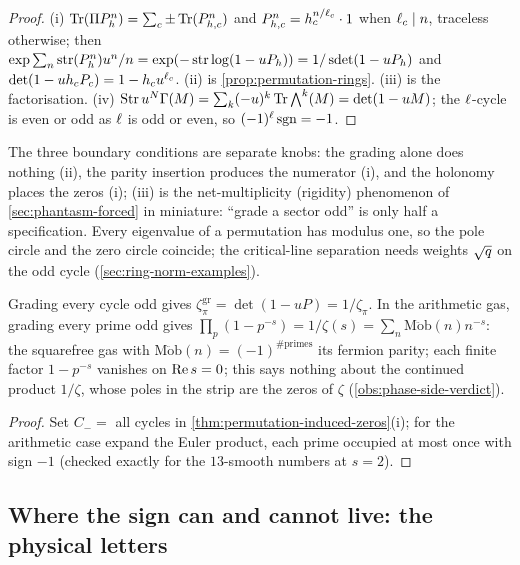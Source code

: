 \begin{proof}
(i) $\operatorname{Tr}(\Pi P_h^n) = \sum_c\pm\operatorname{Tr}(P_{h,c}^n)$ and $P_{h,c}^n = h_c^{n/\ell_c}\cdot1$ when $\ell_c\mid n$,
traceless otherwise; then $\exp\sum_n\operatorname{str}(P_h^n)u^n/n = \exp(-\operatorname{str}\log(1-uP_h)) = 1/\operatorname{sdet}(1-uP_h)$
and $\det(1-uh_cP_c) = 1-h_cu^{\ell_c}$. (ii) is \cref{prop:permutation-rings}. (iii) is the
factorisation. (iv) $\operatorname{Str}u^N\Gamma(M) = \sum_k(-u)^k\operatorname{Tr}\bigwedge^k(M) = \det(1-uM)$; the
$\ell$-cycle is even or odd as $\ell$ is odd or even, so $(-1)^{\ell}\operatorname{sgn} = -1$.
\end{proof}

The three boundary conditions are separate knobs: the grading alone does nothing (ii), the parity
insertion produces the numerator (i), and the holonomy places the zeros (i); (iii) is the net-multiplicity
(rigidity) phenomenon of \cref{sec:phantasm-forced} in miniature: ``grade a sector odd'' is only half a
specification. Every eigenvalue of a permutation has modulus one, so the pole circle and the zero
circle coincide; the critical-line separation needs weights $\sqrt{q}$ on the odd cycle
(\cref{sec:ring-norm-examples}).

\begin{corollary}
\label{cor:moebius-fermion-parity}
Grading every cycle odd gives $\zeta^{\mathrm{gr}}_\pi = \det(1-uP) = 1/\zeta_\pi$. In the
arithmetic gas, grading every prime odd gives $\prod_p(1-p^{-s}) = 1/\zeta(s) = \sum_n\operatorname{M\ddot ob}(n)n^{-s}$:
the squarefree gas with $\operatorname{M\ddot ob}(n) = (-1)^{\#\text{primes}}$ its fermion parity; each finite factor
$1-p^{-s}$ vanishes on $\operatorname{Re} s = 0$; this says nothing about the continued product $1/\zeta$, whose poles in
the strip are the zeros of $\zeta$ (\cref{obs:phase-side-verdict}).
\end{corollary}

\begin{proof}
Set $C_- =$ all cycles in \cref{thm:permutation-induced-zeros}(i); for the arithmetic case expand
the Euler product, each prime occupied at most once with sign $-1$ (checked exactly for the
$13$-smooth numbers at $s = 2$).
\end{proof}

\subsection{Where the sign can and cannot live: the physical letters}

